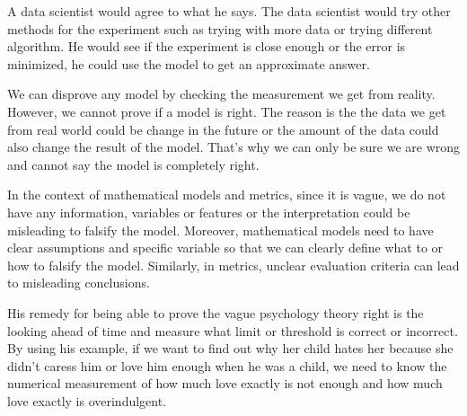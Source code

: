 \documentclass[12pt]{article}
\begin{document}
\begin{enumerate}
A data scientist would agree to what he says. The data scientist would try other methods for the experiment such as trying with more data or trying different algorithm. He would see if the experiment is close enough or the error is minimized, he could use the model to get an approximate answer.


We can disprove any model by checking the measurement we get from reality. However, we cannot prove if a model is right. The reason is the the data we get from real world could be change in the future or the amount of the data could also change the result of the model. That's why we can only be sure we are wrong and cannot say the model is completely right.

 

In the context of mathematical models and metrics, since it is vague, we do not have any information, variables or features or the interpretation could be misleading to falsify the model. Moreover, mathematical models need to have clear assumptions and specific variable so that we can clearly define what to or how to falsify the model. Similarly, in metrics, unclear evaluation criteria can lead to misleading conclusions.


 

His remedy for being able to prove the vague psychology theory right is the looking ahead of time and measure what limit or threshold is correct or incorrect. By using his example, if we want to find out why her child hates her because she didn't caress him or love him enough when he was a child, we need to know the numerical measurement of how much love exactly is not enough and how much love exactly is overindulgent.

 


\end{enumerate}
\end{document}
